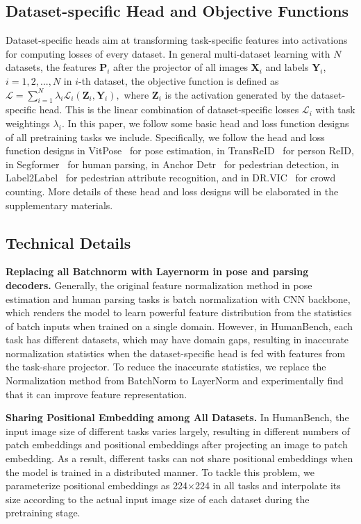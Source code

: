 \documentclass[10pt,twocolumn,letterpaper]{article}
\begin{document}
\subsection{Dataset-specific Head and Objective Functions} \label{sec:loss}
Dataset-specific heads aim at transforming task-specific features into activations for computing losses of every dataset. In general multi-dataset learning with $N$ datasets, the features $\mathbf{P}_i$ after the projector of all images $\mathbf{X}_i$ and labels $\mathbf{Y}_i$, $i=1, 2,..., N$ in $i$-th dataset, the objective function is defined as 
$\mathcal{L} = \sum_{i=1}^{N}\lambda_i \mathcal{L}_i(\mathbf{Z}_i, \mathbf{Y}_i),$
where $\mathbf{Z}_i$ is the activation generated by the dataset-specific head.
This is the linear combination of dataset-specific losses $\mathcal{L}_i$ with task weightings $\lambda_i$. In this paper, we follow some basic head and loss function designs of all pretraining tasks we include. Specifically, we follow the head and loss function designs in VitPose~\cite{xu2022vitpose} for pose estimation, in TransReID~\cite{he2021transreid} for person ReID, in Segformer~\cite{xie2021segformer} for human parsing, in Anchor Detr~\cite{wang2022anchor} for pedestrian detection, in Label2Label~\cite{li2022label2label} for pedestrian attribute recognition, and in DR.VIC~\cite{han2022dr} for crowd counting. More details of these head and loss designs will be elaborated in the supplementary materials.

\subsection{Technical Details}
\noindent \textbf{Replacing all Batchnorm with Layernorm in pose and parsing decoders.} Generally, the original feature normalization method in pose estimation and human parsing tasks is batch normalization with CNN backbone, which renders the model to learn powerful feature distribution from the statistics of batch inputs when trained on a single domain. However, in HumanBench, each task has different datasets, which may have domain gaps, resulting in inaccurate normalization statistics when the dataset-specific head is fed with features from the task-share projector. To reduce the inaccurate statistics, we replace the Normalization method from BatchNorm\cite{ioffe2015batch} to LayerNorm\cite{ba2016layer} and experimentally find that it can improve feature representation. 

\noindent \textbf{Sharing Positional Embedding among All Datasets.} In HumanBench, the input image size of different tasks varies largely, resulting in different numbers of patch embeddings and positional embeddings after projecting an image to patch embedding. As a result, different tasks can not share positional embeddings when the model is trained in a distributed manner. To tackle this problem, we parameterize  positional embeddings as 224$\times$224 in all tasks and interpolate its size according to the actual input image size of each dataset during the pretraining stage.
\end{document}
